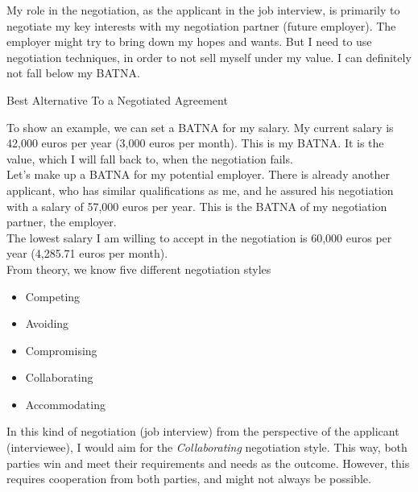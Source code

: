 \noindent My role in the negotiation, as the applicant in the job interview,
is primarily to negotiate my key interests with my negotiation partner
(future employer). The employer might try to bring down my hopes and wants.
But I need to use negotiation techniques, in order to not sell myself under
my value. I can definitely not fall below my BATNA. 

\begin{center}
	\noindent Best Alternative To a Negotiated Agreement
\end{center}


\noindent To show an example, we can set a BATNA for my salary. 
My current salary is 42,000 euros per year (3,000 euros per month).
This is my BATNA. It is the value, which I will fall back to,
when the negotiation fails. \\


\noindent Let's make up a BATNA for my potential employer. 
There is already another applicant, who has similar qualifications as me,
and he assured his negotiation with a salary of 57,000 euros per year.
This is the BATNA of my negotiation partner, the employer. \\

\noindent The lowest salary I am willing to 
accept in the negotiation is 60,000 euros per year (4,285.71 euros per month). \\


\noindent From theory, we know five different negotiation styles

\begin{itemize}
	\item Competing
	\item Avoiding
	\item Compromising
	\item Collaborating
	\item Accommodating
\end{itemize}

\noindent In this kind of negotiation (job interview) from the perspective 
of the applicant (interviewee), I would aim for the \emph{Collaborating} 
negotiation style. This way, both parties win and meet their requirements and
needs as the outcome. However, this requires cooperation from both parties,
and might not always be possible. 























